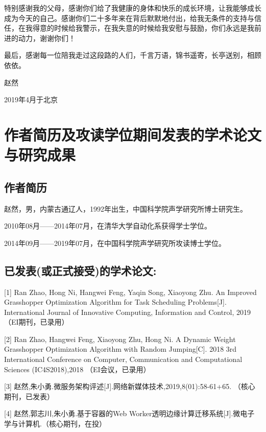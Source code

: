 特别感谢我的父母，感谢你们给了我健康的身体和快乐的成长环境，让我能够成长成为今天的自己。感谢你们二十多年来在背后默默地付出，给我无条件的支持与信任，在我得意的时候给我警示，在我失意的时候给我安慰与鼓励，你们永远是我前进的动力，谢谢你们！

最后，感谢每一位陪我走过这段路的人们，千言万语，锦书遥寄，长亭送别，相顾依依。

\begin{flushright}

    赵然

    2019年4月于北京


\end{flushright}


\chapter{作者简历及攻读学位期间发表的学术论文与研究成果}


\section*{作者简历}

赵然，男，内蒙古通辽人，1992年出生，中国科学院声学研究所博士研究生。

2010年08月——2014年07月，在清华大学自动化系获得学士学位。

2014年09月——2019年07月，在中国科学院声学研究所攻读博士学位。


\section*{已发表(或正式接受)的学术论文:}

[1] Ran Zhao, Hong Ni, Hangwei Feng, Yaqin Song, Xiaoyong Zhu. An Improved Grasshopper Optimization Algorithm for Task Scheduling Problems[J]. International Journal of Innovative Computing, Information and Control, 2019（EI期刊，已录用）

[2] Ran Zhao, Hangwei Feng, Xiaoyong Zhu, Hong Ni. A Dynamic Weight Grasshopper Optimization Algorithm with Random Jumping[C]. 2018 3rd International Conference on Computer, Communication and Computational Sciences (IC4S2018),2018 （EI会议，已录用）

[3] 赵然,朱小勇.微服务架构评述[J].网络新媒体技术,2019,8(01):58-61+65. （核心期刊，已发表）

[4] 赵然,郭志川,朱小勇.基于容器的Web Worker透明边缘计算迁移系统[J].微电子学与计算机.（核心期刊，在投）

